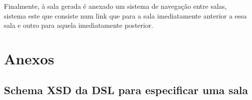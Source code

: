 \documentclass[letterpaper]{article}
\begin{document}
{
Finalmente, \`a sala gerada \'e anexado um sistema de navega\c{c}\~ao
entre salas, sistema este que consiste num link que para a sala
imediatamente anterior a essa sala e outro para aquela imediatamente
posterior.}


\bigskip


\bigskip


\bigskip


\bigskip


\bigskip


\bigskip


\bigskip


\bigskip


\bigskip

\section[Anexos]{ Anexos}
\subsection[Schema XSD da DSL para especificar uma
sala]{ Schema XSD da DSL para especificar uma
sala}

\bigskip


\bigskip


\bigskip


\bigskip


\bigskip


\bigskip


\bigskip


\bigskip


\bigskip


\bigskip


\bigskip


\bigskip


\bigskip


\bigskip


\bigskip


\bigskip


\bigskip


\bigskip


\bigskip


\bigskip


\bigskip


\bigskip


\bigskip


\bigskip


\bigskip


\bigskip
\end{document}
